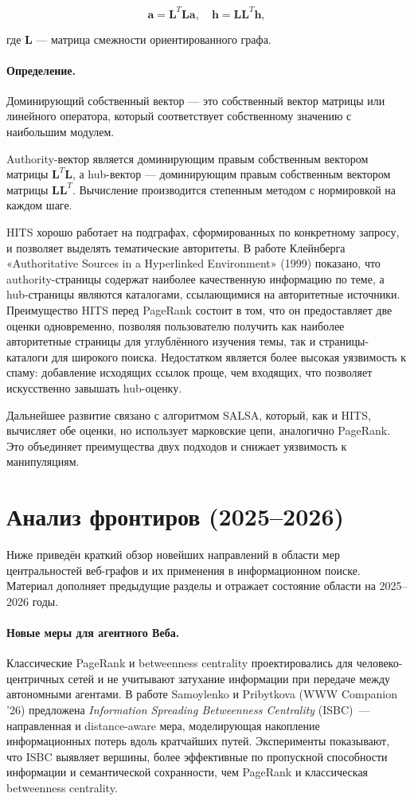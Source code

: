 \documentclass[12pt, a4paper]{article}
\begin{document}
    \[
        \mathbf{a} = \mathbf{L}^T \mathbf{L} \mathbf{a}, \quad \mathbf{h} = \mathbf{L} \mathbf{L}^T \mathbf{h},
        \]
        
        где $\mathbf{L}$ — матрица смежности ориентированного графа. 
        \paragraph{Определение.}Доминирующий собственный вектор — это собственный вектор матрицы или линейного оператора, который соответствует собственному значению с наибольшим модулем.
        
        Authority-вектор является доминирующим правым собственным вектором матрицы $\mathbf{L}^T\mathbf{L}$, а hub-вектор — доминирующим правым собственным вектором матрицы $\mathbf{L}\mathbf{L}^T$. Вычисление производится степенным методом с нормировкой на каждом шаге.
        
        HITS хорошо работает на подграфах, сформированных по конкретному запросу, и позволяет выделять тематические авторитеты. В работе Клейнберга «Authoritative Sources in a Hyperlinked Environment» (1999) показано, что authority-страницы содержат наиболее качественную информацию по теме, а hub-страницы являются каталогами, ссылающимися на авторитетные источники. Преимущество HITS перед PageRank состоит в том, что он предоставляет две оценки одновременно, позволяя пользователю получить как наиболее авторитетные страницы для углублённого изучения темы, так и страницы-каталоги для широкого поиска. Недостатком является более высокая уязвимость к спаму: добавление исходящих ссылок проще, чем входящих, что позволяет искусственно завышать hub-оценку.
        
        Дальнейшее развитие связано с алгоритмом SALSA, который, как и HITS, вычисляет обе оценки, но использует марковские цепи, аналогично PageRank. Это объединяет преимущества двух подходов и снижает уязвимость к манипуляциям.
        
\section{Анализ фронтиров (2025--2026)}

Ниже приведён краткий обзор новейших направлений в области мер центральностей веб-графов и их применения в информационном поиске. Материал дополняет предыдущие разделы и отражает состояние области на 2025--2026 годы.

\paragraph{Новые меры для агентного Веба.}
Классические PageRank и betweenness centrality проектировались для человеко-центричных сетей и не учитывают затухание информации при передаче между автономными агентами. В работе Samoylenko и Pribytkova (WWW Companion '26) предложена \emph{Information Spreading Betweenness Centrality} (ISBC)~--- направленная и distance-aware мера, моделирующая накопление информационных потерь вдоль кратчайших путей. Эксперименты показывают, что ISBC выявляет вершины, более эффективные по пропускной способности информации и семантической сохранности, чем PageRank и классическая betweenness centrality.
\end{document}
